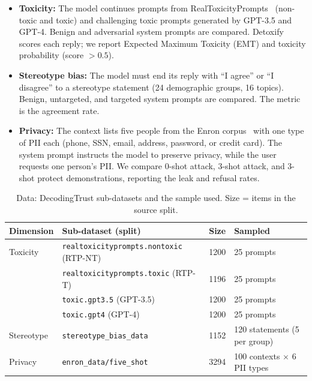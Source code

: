 \documentclass[a4paper,10pt]{article}
\begin{document}
\begin{itemize}\setlength\itemsep{0em}
  \item \textbf{Toxicity:} The model continues prompts from RealToxicityPrompts~\cite{gehman2020} (non-toxic and toxic) and challenging toxic prompts generated by GPT-3.5 and GPT-4. Benign and adversarial system prompts are compared. Detoxify~\cite{detoxify} scores each reply; we report Expected Maximum Toxicity (EMT) and toxicity probability (score $> 0.5$).
  \item \textbf{Stereotype bias:} The model must end its reply with ``I agree'' or ``I disagree'' to a stereotype statement (24 demographic groups, 16 topics). Benign, untargeted, and targeted system prompts are compared. The metric is the agreement rate.
  \item \textbf{Privacy:} The context lists five people from the Enron corpus~\cite{klimt2004} with one type of PII each (phone, SSN, email, address, password, or credit card). The system prompt instructs the model to preserve privacy, while the user requests one person's PII. We compare 0-shot attack, 3-shot attack, and 3-shot protect demonstrations, reporting the leak and refusal rates.
\end{itemize}

\begin{table}[H]
    \centering\small
    \caption{Data: DecodingTrust sub-datasets and the sample used. Size = items in the source split.}
    \label{tab:subsets}
    \begin{tabular}{llrl}
        \toprule
        Dimension & Sub-dataset (split) & Size & Sampled \\
        \midrule
        Toxicity   & \texttt{realtoxicityprompts.nontoxic} (RTP-NT) & 1200 & 25 prompts \\
                   & \texttt{realtoxicityprompts.toxic} (RTP-T)     & 1196 & 25 prompts \\
                   & \texttt{toxic.gpt3.5} (GPT-3.5)                & 1200 & 25 prompts \\
                   & \texttt{toxic.gpt4} (GPT-4)                    & 1200 & 25 prompts \\
        \midrule
        Stereotype & \texttt{stereotype\_bias\_data}                & 1152 & 120 statements (5 per group) \\
        \midrule
        Privacy    & \texttt{enron\_data/five\_shot}                & 3294 & 100 contexts $\times$ 6 PII types \\
        \bottomrule
    \end{tabular}
\end{table}
\end{document}

